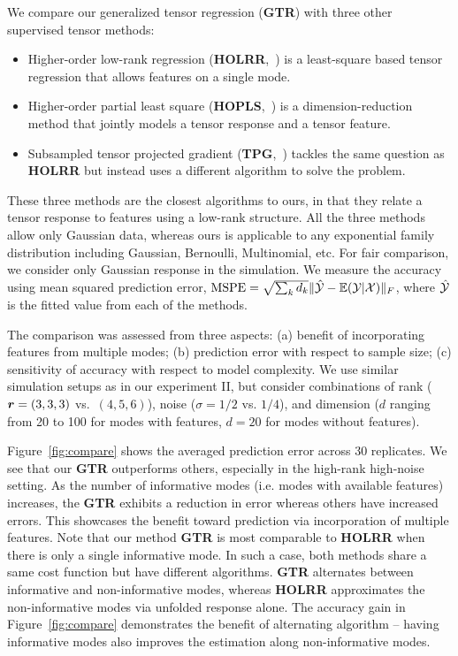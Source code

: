 \documentclass[12pt]{article}
\theoremstyle{plain}
\theoremstyle{definition}
\begin{document}
We compare our generalized tensor regression ({\bf GTR}) with three other supervised tensor methods:
\begin{itemize}
\item  Higher-order low-rank regression ({\bf HOLRR},~\citep{rabusseau2016low}) is a least-square based tensor regression that allows features on a single mode. 
\item Higher-order partial least square ({\bf HOPLS},~\citep{zhao2012higher}) is a dimension-reduction method that jointly models a tensor response and a tensor feature. 
\item Subsampled tensor projected gradient ({\bf TPG},~\citep{yu2016learning}) tackles the same question as {\bf HOLRR} but instead uses a different algorithm to solve the problem. 
\end{itemize}
These three methods are the closest algorithms to ours, in that they relate a tensor response to features using a low-rank structure. All the three methods allow only Gaussian data, whereas ours is applicable to any exponential family distribution including Gaussian, Bernoulli, Multinomial, etc. For fair comparison, we consider only Gaussian response in the simulation. We measure the accuracy using mean squared prediction error, $\text{MSPE}=\sqrt{\sum_kd_k}\lVert\hat {\mathcal{Y}}-\mathbb{E}(\mathcal{Y}|\mathcal{X})\rVert_F$, where $\hat {\mathcal{Y}}$ is the fitted value from each of the methods. 

The comparison was assessed from three aspects: (a) benefit of incorporating features from multiple modes; (b) prediction error with respect to sample size; (c) sensitivity of accuracy with respect to model complexity. We use similar simulation setups as in our experiment II, but consider combinations of rank ($\bm{r}=(3,3,3)$ vs.\ $(4,5,6)$), noise ($\sigma = 1/2$ vs. $1/4$), and dimension ($d$ ranging from 20 to 100 for modes with features, $d = 20$ for modes without features). 

Figure~\ref{fig:compare} shows the averaged prediction error across 30 replicates. We see that our {\bf GTR} outperforms others, especially in the high-rank high-noise setting. As the number of informative modes (i.e. modes with available features) increases, the {\bf GTR} exhibits a reduction in error whereas others have increased errors. This showcases the benefit toward prediction via incorporation of multiple features. Note that our method {\bf GTR} is most comparable to {\bf HOLRR} when there is only a single informative mode. In such a case, both methods share a same cost function but have different algorithms. {\bf GTR} alternates between informative and non-informative modes, whereas {\bf HOLRR} approximates the non-informative modes via unfolded response alone. The accuracy gain in Figure~\ref{fig:compare} demonstrates the benefit of alternating algorithm -- having informative modes also improves the estimation along non-informative modes. 
\end{document}
